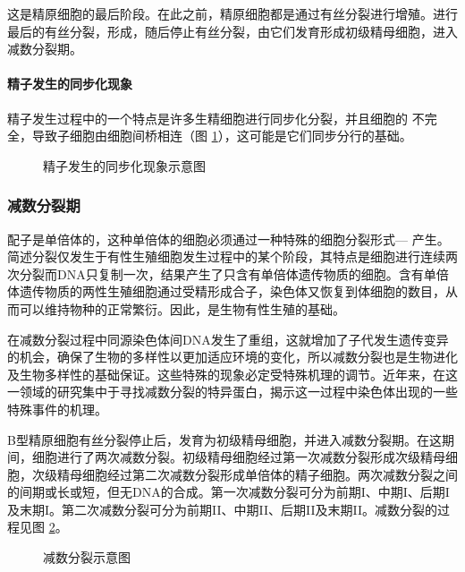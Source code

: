 这是精原细胞的最后阶段。在此之前，精原细胞都是通过有丝分裂进行增殖。进行最后的有丝分裂，形成，随后停止有丝分裂，由它们发育形成初级精母细胞，进入减数分裂期。

\paragraph{精子发生的同步化现象}

精子发生过程中的一个特点是许多生精细胞进行同步化分裂，并且细胞的
不完全，导致子细胞由细胞间桥相连（图 \ref{figure_spermatogenesis_synchronization}），这可能是它们同步分行的基础。

\begin{figure}
\centering
\myFigurePlaceholder
\caption{精子发生的同步化现象示意图}
\label{figure_spermatogenesis_synchronization}
\end{figure}

\subsubsection{减数分裂期}

配子是单倍体的，这种单倍体的细胞必须通过一种特殊的细胞分裂形式---
产生。简述分裂仅发生于有性生殖细胞发生过程中的某个阶段，其特点是细胞进行连续两次分裂而DNA只复制一次，结果产生了只含有单倍体遗传物质的细胞。含有单倍体遗传物质的两性生殖细胞通过受精形成合子，染色体又恢复到体细胞的数目，从而可以维持物种的正常繁衍。因此，是生物有性生殖的基础。

在减数分裂过程中同源染色体间DNA发生了重组，这就增加了子代发生遗传变异的机会，确保了生物的多样性以更加适应环境的变化，所以减数分裂也是生物进化及生物多样性的基础保证。这些特殊的现象必定受特殊机理的调节。近年来，在这一领域的研究集中于寻找减数分裂的特异蛋白，揭示这一过程中染色体出现的一些特殊事件的机理。

B型精原细胞有丝分裂停止后，发育为初级精母细胞，并进入减数分裂期。在这期间，细胞进行了两次减数分裂。初级精母细胞经过第一次减数分裂形成次级精母细胞，次级精母细胞经过第二次减数分裂形成单倍体的精子细胞。两次减数分裂之间的间期或长或短，但无DNA的合成。第一次减数分裂可分为前期I、中期I、后期I及末期I。第二次减数分裂可分为前期II、中期II、后期II及末期II。减数分裂的过程见图 \ref{图-减数分裂示意图}。

\begin{figure}[H]
\centering
\myFigurePlaceholder
\caption{减数分裂示意图}
\label{图-减数分裂示意图}
\end{figure}

